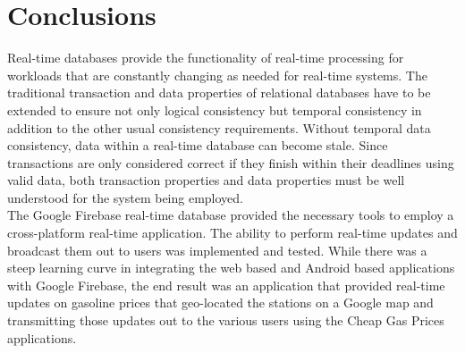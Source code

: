 \documentclass[conference]{IEEEtran}
\begin{document}
\section{Conclusions}
Real-time databases provide the functionality of real-time processing for workloads that are constantly changing as needed for real-time systems. The traditional transaction and data properties of relational databases have to be extended to ensure not only logical consistency but temporal consistency in addition to the other usual consistency requirements. Without temporal data consistency, data within a real-time database can become stale. Since transactions are only considered correct if they finish within their deadlines using valid data, both transaction properties and data properties must be well understood for the system being employed.\\
\indent The Google Firebase real-time database provided the necessary tools to employ a cross-platform real-time application. The ability to perform real-time updates and broadcast them out to users was implemented and tested. While there was a steep learning curve in integrating the web based and Android based applications with Google Firebase, the end result was an application that provided real-time updates on gasoline prices that geo-located the stations on a Google map and transmitting those updates out to the various users using the Cheap Gas Prices applications.

%
%
\end{document}
